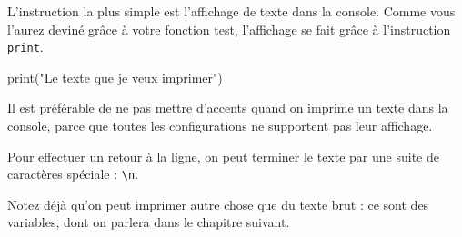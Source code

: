 L'instruction la plus simple est l'affichage de texte dans la console. Comme vous l'aurez deviné grâce à votre fonction test, l'affichage se fait grâce à l'instruction \texttt{print}.

\begin{python}
print("Le texte que je veux imprimer")
\end{python}

Il est préférable de ne pas mettre d'accents quand on imprime un texte dans la console, parce que toutes les configurations ne supportent pas leur affichage.

Pour effectuer un retour à la ligne, on peut terminer le texte par une suite de caractères spéciale : \lstinline{\n}.

Notez déjà qu'on peut imprimer autre chose que du texte brut : ce sont des variables, dont on parlera dans le chapitre suivant.